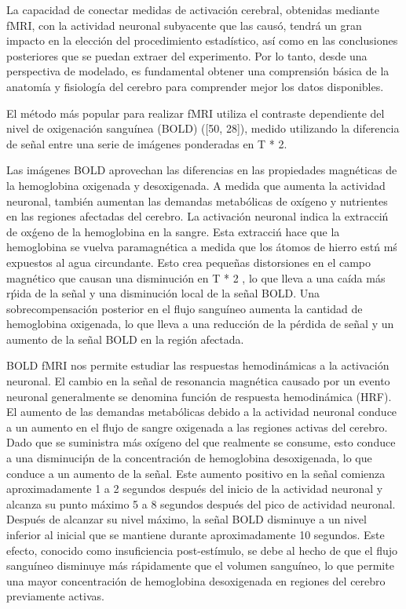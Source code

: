 La capacidad de conectar medidas de activación cerebral, obtenidas mediante fMRI, con la actividad neuronal subyacente que las causó, tendrá un gran impacto en la elección del procedimiento estadístico, así como en las conclusiones posteriores que se puedan extraer del experimento. Por lo tanto, desde una perspectiva de modelado, es fundamental obtener una comprensión básica de la anatom\'ia y  fisiología del cerebro para comprender mejor los datos disponibles. 

El método más popular para realizar fMRI utiliza el contraste dependiente del nivel de oxigenación sanguínea (BOLD) ([50, 28]), medido utilizando la diferencia de señal entre una serie de imágenes ponderadas en T * 2. 

Las im\'agenes BOLD aprovechan las diferencias en las propiedades magn\'eticas de la hemoglobina oxigenada y desoxigenada. A medida que aumenta la actividad neuronal, tambi\'en aumentan las demandas metab\'olicas de ox\'igeno y nutrientes en las regiones afectadas del cerebro. La activaci\'on neuronal indica la extracci\'n de ox\'geno de la hemoglobina en la sangre. Esta extracci\'n hace que la hemoglobina se vuelva paramagn\'etica a medida que los \'atomos de hierro est\'n m\'s expuestos al agua circundante. Esto crea pequeñas distorsiones en el campo magn\'etico que causan una disminuci\'on en T * 2 , lo que lleva a una ca\'ida m\'as r\'pida de la señal y una disminuci\'on local de la señal BOLD. Una sobrecompensaci\'on posterior en el flujo sangu\'ineo aumenta la cantidad de hemoglobina oxigenada, lo que lleva a una reducci\'on de la p\'erdida de señal y un aumento de la señal BOLD en la regi\'on afectada.

BOLD fMRI nos permite estudiar las respuestas hemodin\'amicas a la activaci\'on neuronal. El cambio en la señal de resonancia magn\'etica causado por un evento neuronal generalmente se denomina funci\'on de respuesta hemodin\'amica (HRF). El aumento de las demandas metab\'olicas debido a la actividad neuronal conduce a un aumento en el flujo de sangre oxigenada a las regiones activas del cerebro. Dado que se suministra más ox\'igeno del que realmente se consume, esto conduce a una disminuci\'pn de la concentración de hemoglobina desoxigenada, lo que conduce a un aumento de la señal. Este aumento positivo en la señal comienza aproximadamente 1 a 2 segundos despu\'es del inicio de la actividad neuronal y alcanza su punto m\'aximo 5 a 8 segundos despu\'es del pico de actividad neuronal. Después de alcanzar su nivel m\'aximo, la señal BOLD disminuye a un nivel inferior al inicial que se mantiene durante aproximadamente 10 segundos. Este efecto, conocido como insuficiencia post-est\'imulo, se debe al hecho de que el flujo sangu\'ineo disminuye m\'as r\'apidamente que el volumen sangu\'ineo, lo que permite una mayor concentraci\'on de hemoglobina desoxigenada en regiones del cerebro previamente activas.

